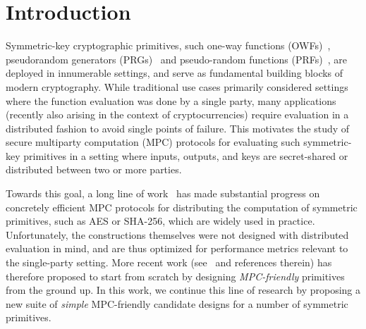 
\section{Introduction}
\label{sec:introduction}

Symmetric-key cryptographic primitives, such one-way functions (OWFs)~\cite{levin1985-owf},
 pseudorandom generators (PRGs)~\cite{blum1984-prg,yao1982-prg}
and pseudo-random functions (PRFs)~\cite{goldreich1984-prf}, are deployed in innumerable settings, and serve as fundamental building blocks of modern cryptography. While traditional use cases primarily considered settings where the function evaluation was done by a single party, many applications (recently also arising in the context of cryptocurrencies)
require evaluation in a distributed fashion to avoid single points of failure. This motivates the study of secure multiparty computation (MPC) protocols for evaluating such symmetric-key primitives in a setting where inputs, outputs, and keys are secret-shared or distributed between two or more parties.

Towards this goal, a long line of work~\cite{damgard2010-aes, pinkas2009-aes, wang2017-mpc} has made substantial progress on concretely efficient MPC protocols for distributing the computation of symmetric primitives, such as AES or SHA-256, which are widely used in practice. Unfortunately, the constructions themselves were not designed with distributed evaluation in mind, and are thus optimized for performance metrics relevant to the single-party setting. More recent work (see~\cite{albrecht2015-lowmc, grassi2016-mpcfriendly, boneh2018-darkmatter,albrecht2019-feistal-mpc, aly2020-design-mpc} and references therein) has therefore proposed to start from scratch by designing \textit{MPC-friendly} primitives from the ground up.
In this work, we continue this line of research by proposing a new suite of \textit{simple} MPC-friendly candidate designs for a number of symmetric primitives.



